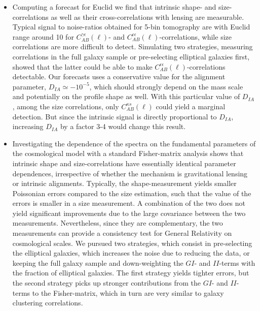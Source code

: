 \documentclass[a4paper,fleqn,usenatbib]{mnras}
\begin{document}
\begin{itemize}
\item{Computing a forecast for Euclid we find that intrinsic shape- and size-correlations as well as their cross-correlations with lensing are measurable. Typical signal to noise-ratios obtained for 5-bin tomography are with Euclid range around 10 for $C^{\gamma\epsilon}_{AB}(\ell)$- and $C^{\epsilon\epsilon}_{AB}(\ell)$-correlations, while size correlations are more difficult to detect. Simulating two strategies, measuring correlations in the full galaxy sample or pre-selecting elliptical galaxies first, showed that the latter could be able to make $C^{\epsilon\epsilon}_{AB}(\ell)$-correlations detectable. Our forecasts uses a conservative value for the alignment parameter, $D_{IA}\simeq -10^{-5}$, which should strongly depend on the mass scale \citep{piras_mass_2018} and potentially on the profile shape as well. With this particular value of $D_{IA}$, among the size correlations, only $C^{\kappa s}_{AB}(\ell)$ could yield a marginal detection. But since the intrinsic signal is directly proportional to $D_{IA}$, increasing $D_{IA}$ by a factor 3-4 would change this result.}

\item{Investigating the dependence of the spectra on the fundamental parameters of the cosmological model with a standard Fisher-matrix analysis shows that intrinsic shape and size-correlations have essentially identical parameter dependences, irrespective of whether the mechanism is gravitational lensing or intrinsic alignments. Typically, the shape-measurement yields smaller Poissonian errors compared to the size estimation, such that the value of the errors is smaller in a size measurement. A combination of the two does not yield significant improvements due to the large covariance between the two measurements. Nevertheless, since they are complementary, the two measurements can provide a consistency test for General Relativity on cosmological scales. We pursued two strategies, which consist in pre-selecting the elliptical galaxies, which increases the noise due to reducing the data, or keeping the full galaxy sample and down-weighting the $GI$- and $II$-terms with the fraction of elliptical galaxies. The first strategy yields tighter errors, but  the second strategy picks up stronger contributions from the $GI$- and $II$-terms to the Fisher-matrix, which in turn are very similar to galaxy clustering correlations.}

\end{itemize}
\end{document}
